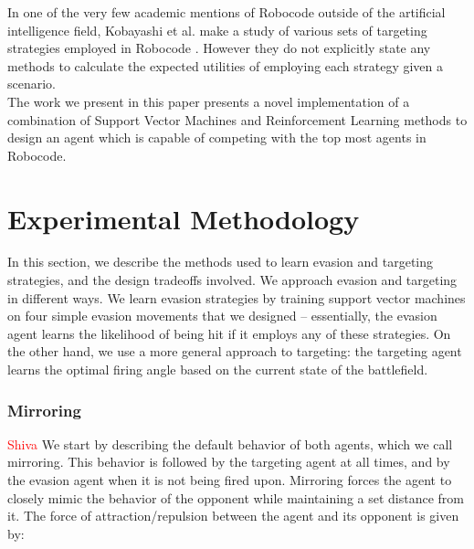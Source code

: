 \documentclass{article}
\newcommand{\xxx}[1]{\textcolor{red}{#1}}
\theoremstyle{plain}
\theoremstyle{definition}
\theoremstyle{remark}
\begin{document}
In one of the very few academic mentions of Robocode outside of the artificial intelligence field, Kobayashi et al. make a study of various sets of targeting strategies employed in Robocode \cite{strategies}. However they do not explicitly state any methods to calculate the expected utilities of employing each strategy given a scenario.\\



The work we present in this paper presents a novel implementation of a combination of Support Vector Machines and Reinforcement Learning methods to design an agent which is capable of competing with the top most agents in Robocode.

\section{Experimental Methodology}
In this section, we describe the methods used to learn evasion and targeting strategies, and the design tradeoffs involved. We approach evasion and targeting in different ways. We learn evasion strategies by training support vector machines on four simple evasion movements that we designed -- essentially, the evasion agent learns the likelihood of being hit if it employs any of these strategies. On the other hand, we use a more general approach to targeting: the targeting agent learns the optimal firing angle based on the current state of the battlefield.

\subsubsection*{Mirroring}
\xxx{Shiva}
We start by describing the default behavior of both agents, which we call mirroring. This behavior is followed by the targeting agent at all times, and by the evasion agent when it is not being fired upon. Mirroring forces the agent to closely mimic the behavior of the opponent while maintaining a set distance from it. The force of attraction/repulsion between the agent and its opponent is given by:
\end{document}
